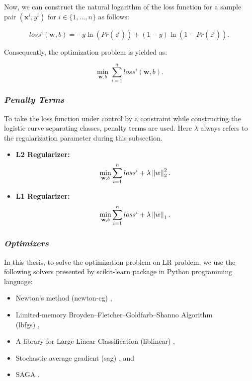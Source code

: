 Now, we can construct the natural logarithm of the loss function for a sample pair $(\textbf{x}^{i}, y^{i})$ for $i \in \{1, ..., n\}$ as follows:

\begin{equation}
	\label{log_loss_onesample} 
	loss^{i}(\textbf{w}, b) = -y\ln(Pr(z^{i}))  + (1-y)\ln(1-Pr(z^{i})).
\end{equation}

Consequently, the optimization problem is yielded as:

\begin{equation}
	\label{lr_optimization} 
	\min_{\textbf{w}, b} \sum_{i=1}^{n} loss^{i}(\textbf{w}, b).
\end{equation}

\subsubsection*{\textit{Penalty Terms}}
To take the loss function under control by a constraint while constructing the logistic curve separating classes, penalty terms are used. Here $\lambda$ always refers to the regularization parameter during this subsection.

\begin{itemize}
	\item \textbf{L2 Regularizer:}
	\begin{equation}
		\label{lr_l1} 
		\min_{\textbf{w}, b} \sum_{i=1}^{n} loss^{i} + \lambda \left\lVert w\right\rVert_{2}^{2}.
	\end{equation}
	\item \textbf{L1 Regularizer:}
	\begin{equation}
		\label{lr_l1} 
		\min_{\textbf{w}, b} \sum_{i=1}^{n} loss^{i} + \lambda \left\lVert w\right\rVert_{1}.
	\end{equation}
\end{itemize}


\subsubsection*{\textit{Optimizers}}

In this thesis, to solve the optimization problem on LR problem, we use the following solvers presented by scikit-learn package \cite{scikit-learn} in Python programming language:

\begin{itemize}
	\item Newton’s method (newton-cg) \cite{lr_newton_cg}, 
	
	\item Limited-memory Broyden–Fletcher–Goldfarb–Shanno Algorithm \\(lbfgs) \cite{lr_lbfgsb},
	
	\item A library for Large Linear Classification (liblinear) \cite{lr_liblinear},
	
	\item Stochastic average gradient (sag) \cite{lr_sag}, and
	
	\item SAGA \cite{lr_saga}.
\end{itemize}

